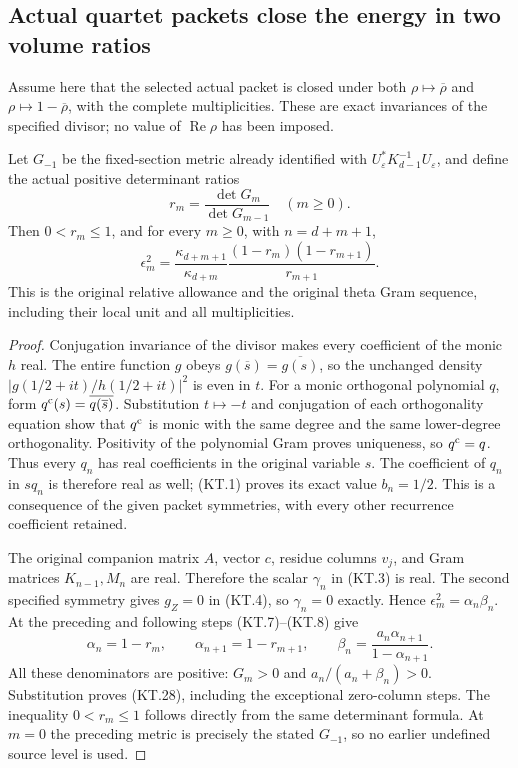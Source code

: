 \subsection{Actual quartet packets close the energy in two volume ratios}

Assume here that the selected actual packet is closed under both
\(\rho\mapsto\overline\rho\) and
\(\rho\mapsto1-\overline\rho\), with the complete multiplicities.
These are exact invariances of the specified divisor; no value of
\(\operatorname{Re}\rho\) has been imposed.

\begin{theorem}
Let \(G_{-1}\) be the fixed-section metric already identified
with \(U_\varepsilon^*K_{d-1}^{-1}U_\varepsilon\), and define
the actual positive determinant ratios
\[
 r_m=\frac{\det G_m}{\det G_{m-1}}\quad(m\geq0).
\]
Then \(0<r_m\leq1\), and for every \(m\geq0\), with
\(n=d+m+1\),
\[
 \boxed{\epsilon_m^2
   =\frac{\kappa_{d+m+1}}{\kappa_{d+m}}
       \frac{(1-r_m)(1-r_{m+1})}{r_{m+1}}.}             \tag{KT.28}
\]
This is the original relative allowance and the original theta
Gram sequence, including their local unit and all multiplicities.
\end{theorem}

\begin{proof}
Conjugation invariance of the divisor makes every coefficient of
the monic \(h\) real.  The entire function \(g\) obeys
\(g(\overline s)=\overline{g(s)}\), so the unchanged density
\(|g(1/2+it)/h(1/2+it)|^2\) is even in \(t\).
For a monic orthogonal polynomial \(q\), form
\(q^{\rm c}(s)=\overline{q(\overline s)}\).
Substitution \(t\mapsto-t\) and conjugation of each
orthogonality equation show that \(q^{\rm c}\) is monic with
the same degree and the same lower-degree orthogonality.  Positivity
of the polynomial Gram proves uniqueness, so \(q^{\rm c}=q\).
Thus every \(q_n\) has real coefficients in the original variable
\(s\).  The coefficient of \(q_n\) in \(sq_n\) is therefore
real as well; (KT.1) proves its exact value \(b_n=1/2\).
This is a consequence of the given packet symmetries, with every
other recurrence coefficient retained.

The original companion matrix \(A\), vector \(c\), residue
columns \(v_j\), and Gram matrices \(K_{n-1},M_n\) are real.
Therefore the scalar \(\gamma_n\) in (KT.3) is real.
The second specified symmetry gives \(g_Z=0\) in (KT.4),
so \(\gamma_n=0\) exactly.  Hence
\(\epsilon_m^2=\alpha_n\beta_n\).
At the preceding and following steps (KT.7)--(KT.8) give
\[
 \alpha_n=1-r_m,\qquad
 \alpha_{n+1}=1-r_{m+1},\qquad
 \beta_n=\frac{a_n\alpha_{n+1}}{1-\alpha_{n+1}}.
\]
All these denominators are positive: \(G_m>0\) and
\(a_n/(a_n+\beta_n)>0\).  Substitution proves (KT.28),
including the exceptional zero-column steps.  The inequality
\(0<r_m\leq1\) follows directly from the same determinant
formula.  At \(m=0\) the preceding metric is precisely the
stated \(G_{-1}\), so no earlier undefined source level is used.
\end{proof}

